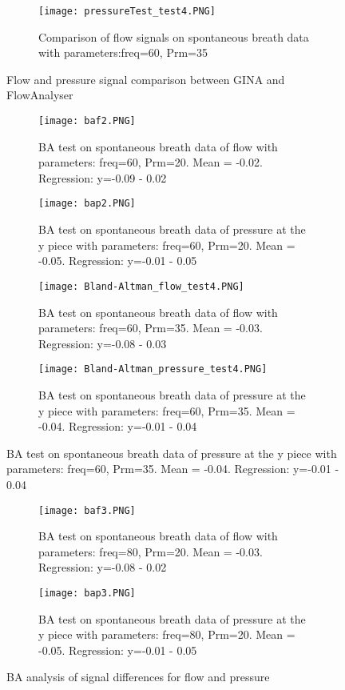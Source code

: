 \documentclass[12pt, openany, oneside]{book}
\begin{document}
\begin{figure}\ContinuedFloat
	\begin{subfigure}[t]{0.99\textwidth}
		\centering
		\texttt{[image: pressureTest\_test4.PNG]}
		
		\caption{Comparison of flow signals on spontaneous breath data with parameters:freq=60, Prm=35}
		\label{fig:p4}
	\end{subfigure}
	\caption{Flow and pressure signal comparison between GINA and FlowAnalyser}
	\label{fig:fullsigs}
\end{figure}

\begin{figure}
	\begin{subfigure}[t]{0.49\textwidth}
		\centering
		\texttt{[image: baf2.PNG]}		
		\caption{BA test on spontaneous breath data of flow with parameters: freq=60, Prm=20. Mean = -0.02. Regression: y=-0.09 - 0.02}
		\label{fig:baf2}
	\end{subfigure}%
	\hfill
	\begin{subfigure}[t]{0.49\textwidth}
		\centering
		\texttt{[image: bap2.PNG]}		
		\caption{BA test on spontaneous breath data of pressure at the y piece with parameters: freq=60, Prm=20. Mean = -0.05. Regression: y=-0.01 - 0.05}
		\label{fig:bap2}
	\end{subfigure}
	\medskip
	\begin{subfigure}[t]{0.49\textwidth}
		\centering
		\texttt{[image: Bland-Altman\_flow\_test4.PNG]}		
		\caption{BA test on spontaneous breath data of flow with parameters: freq=60, Prm=35. Mean = -0.03. Regression: y=-0.08 - 0.03}
		\label{fig:baf4}
	\end{subfigure}%
	\hfill
	\begin{subfigure}[t]{0.49\textwidth}
		\centering
		\texttt{[image: Bland-Altman\_pressure\_test4.PNG]}		
		\caption{BA test on spontaneous breath data of pressure at the y piece with parameters: freq=60, Prm=35. Mean = -0.04. Regression: y=-0.01 - 0.04}
		\label{fig:bap4}
	\end{subfigure}
\end{figure}
\begin{figure}\ContinuedFloat
\begin{subfigure}[t]{0.49\textwidth}
		\centering
		\texttt{[image: baf3.PNG]}		
		\caption{BA test on spontaneous breath data of flow with parameters: freq=80, Prm=20. Mean = -0.03. Regression: y=-0.08 - 0.02}
		\label{fig:baf3}
	\end{subfigure}%
	\hfill
	\begin{subfigure}[t]{0.49\textwidth}
		\centering
		\texttt{[image: bap3.PNG]}		
		\caption{BA test on spontaneous breath data of pressure at the y piece with parameters: freq=80, Prm=20. Mean = -0.05. Regression: y=-0.01 - 0.05}
		\label{fig:bap3}
	\end{subfigure}

\caption{BA analysis of signal differences for flow and pressure}
\label{fig:bigba}
\end{figure}
\end{document}
